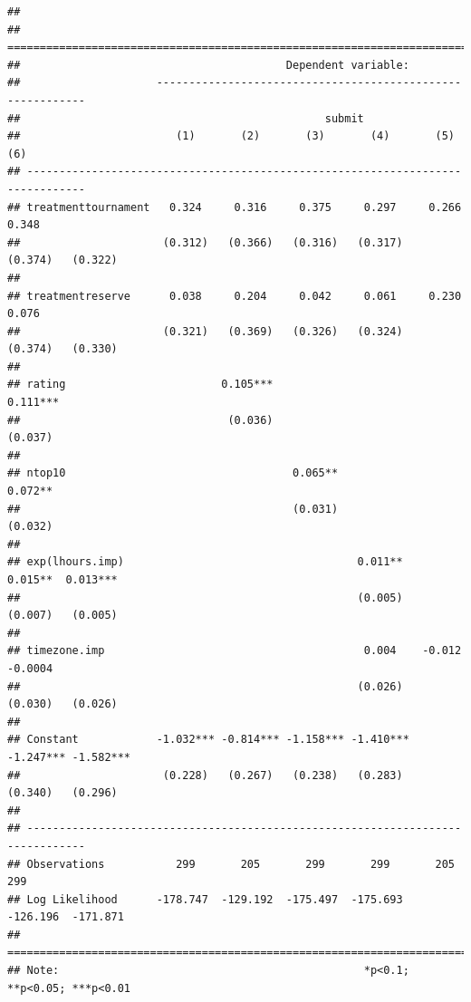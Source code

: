 \documentclass[]{article}
\begin{document}
\begin{verbatim}
## 
## ===============================================================================
##                                         Dependent variable:                    
##                     -----------------------------------------------------------
##                                               submit                           
##                        (1)       (2)       (3)       (4)       (5)       (6)   
## -------------------------------------------------------------------------------
## treatmenttournament   0.324     0.316     0.375     0.297     0.266     0.348  
##                      (0.312)   (0.366)   (0.316)   (0.317)   (0.374)   (0.322) 
##                                                                                
## treatmentreserve      0.038     0.204     0.042     0.061     0.230     0.076  
##                      (0.321)   (0.369)   (0.326)   (0.324)   (0.374)   (0.330) 
##                                                                                
## rating                        0.105***                      0.111***           
##                                (0.036)                       (0.037)           
##                                                                                
## ntop10                                   0.065**                       0.072** 
##                                          (0.031)                       (0.032) 
##                                                                                
## exp(lhours.imp)                                    0.011**   0.015**  0.013*** 
##                                                    (0.005)   (0.007)   (0.005) 
##                                                                                
## timezone.imp                                        0.004    -0.012    -0.0004 
##                                                    (0.026)   (0.030)   (0.026) 
##                                                                                
## Constant            -1.032*** -0.814*** -1.158*** -1.410*** -1.247*** -1.582***
##                      (0.228)   (0.267)   (0.238)   (0.283)   (0.340)   (0.296) 
##                                                                                
## -------------------------------------------------------------------------------
## Observations           299       205       299       299       205       299   
## Log Likelihood      -178.747  -129.192  -175.497  -175.693  -126.196  -171.871 
## ===============================================================================
## Note:                                               *p<0.1; **p<0.05; ***p<0.01
\end{verbatim}
\end{document}
